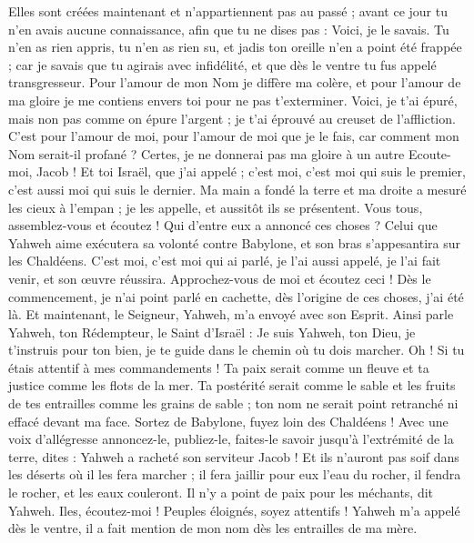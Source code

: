 \begin{multicols}{2}
Elles sont créées maintenant et n'appartiennent pas au passé ; avant ce jour tu n'en avais aucune connaissance, afin que tu ne dises pas : Voici, je le savais.
Tu n'en as rien appris, tu n'en as rien su, et jadis ton oreille n'en a point été frappée ; car je savais que tu agirais avec infidélité, et que dès le ventre tu fus appelé transgresseur.
Pour l'amour de mon Nom je diffère ma colère, et pour l'amour de ma gloire je me contiens envers toi pour ne pas t'exterminer.
Voici, je t'ai épuré, mais non pas comme on épure l'argent ; je t'ai éprouvé au creuset de l'affliction.
C'est pour l'amour de moi, pour l'amour de moi que je le fais, car comment mon Nom serait-il profané ? Certes, je ne donnerai pas ma gloire à un autre
Ecoute-moi, Jacob ! Et toi Israël, que j'ai appelé ; c'est moi, c'est moi qui suis le premier, c'est aussi moi qui suis le dernier.
Ma main a fondé la terre et ma droite a mesuré les cieux à l'empan ; je les appelle, et aussitôt ils se présentent.
Vous tous, assemblez-vous et écoutez ! Qui d'entre eux a annoncé ces choses ? Celui que Yahweh aime exécutera sa volonté contre Babylone, et son bras s'appesantira sur les Chaldéens.
C'est moi, c'est moi qui ai parlé, je l'ai aussi appelé, je l'ai fait venir, et son œuvre réussira.
Approchez-vous de moi et écoutez ceci ! Dès le commencement, je n'ai point parlé en cachette, dès l'origine de ces choses, j'ai été là. Et maintenant, le Seigneur, Yahweh, m'a envoyé avec son Esprit.
Ainsi parle Yahweh, ton Rédempteur, le Saint d'Israël : Je suis Yahweh, ton Dieu, je t'instruis pour ton bien, je te guide dans le chemin où tu dois marcher.
Oh ! Si tu étais attentif à mes commandements ! Ta paix serait comme un fleuve et ta justice comme les flots de la mer.
Ta postérité serait comme le sable et les fruits de tes entrailles comme les grains de sable ; ton nom ne serait point retranché ni effacé devant ma face.
Sortez de Babylone, fuyez loin des Chaldéens ! Avec une voix d'allégresse annoncez-le, publiez-le, faites-le savoir jusqu'à l'extrémité de la terre, dites : Yahweh a racheté son serviteur Jacob !
Et ils n'auront pas soif dans les déserts où il les fera marcher ; il fera jaillir pour eux l'eau du rocher, il fendra le rocher, et les eaux couleront.
Il n'y a point de paix pour les méchants, dit Yahweh.
\VerseOne{}Iles, écoutez-moi ! Peuples éloignés, soyez attentifs ! Yahweh m'a appelé dès le ventre, il a fait mention de mon nom dès les entrailles de ma mère.

\end{multicols}
